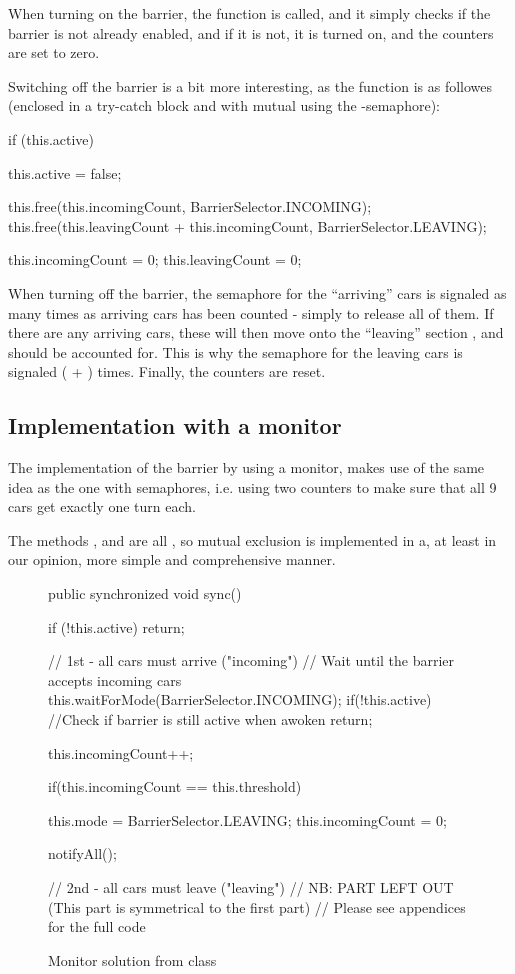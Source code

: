 When turning on the barrier, the function  is called, and
it simply checks if the barrier is not already enabled, and if it is
not, it is turned on, and the counters are set to zero.

Switching off the barrier is a bit more interesting, as the function
 is as followes (enclosed in a try-catch block and with
mutual using the -semaphore):

\begin{java}
if (this.active) {
	this.active = false;

	this.free(this.incomingCount, BarrierSelector.INCOMING);
	this.free(this.leavingCount + this.incomingCount, BarrierSelector.LEAVING);

	this.incomingCount = 0;
	this.leavingCount = 0;
}
\end{java}

When turning off the barrier, the semaphore for the ``arriving'' cars
is signaled as many times as arriving cars has been counted - simply
to release all of them. If there are any arriving cars, these will
then move onto the ``leaving'' section , and should be
accounted for. This is why the semaphore for the leaving cars is
signaled ( + ) times. Finally,
the counters are reset.

\subsection{Implementation with a monitor}
\label{sub:bar-moni}
The implementation of the barrier by using a monitor, makes use of the
same idea as the one with semaphores, i.e. using two counters to make
sure that all 9 cars get exactly one turn each.

The methods ,  and  are all
, so mutual exclusion is implemented in a, at least
in our opinion, more simple and comprehensive manner.

\begin{figure}[H]
\begin{java}
public synchronized void sync() {
	if (!this.active)
		return;

	// 1st - all cars must arrive ("incoming")
	// Wait until the barrier accepts incoming cars
	this.waitForMode(BarrierSelector.INCOMING);
	if(!this.active) //Check if barrier is still active when awoken
		return;

	this.incomingCount++;

	if(this.incomingCount == this.threshold) {
		this.mode = BarrierSelector.LEAVING;
		this.incomingCount = 0;

		notifyAll();
	}
	// 2nd - all cars must leave ("leaving")
	// NB: PART LEFT OUT (This part is symmetrical to the first part)
	// Please see appendices for the full code
}
\end{java}
\caption{Monitor solution from  class}
\label{lst:bar-moni}
\end{figure}

